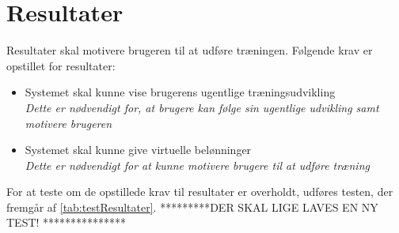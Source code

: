 \section{Resultater}
Resultater skal motivere brugeren til at udføre træningen. Følgende krav er opstillet for resultater:
\begin{itemize}
\item Systemet skal kunne vise brugerens ugentlige træningsudvikling
\\
\textit{Dette er nødvendigt for, at brugere kan følge sin ugentlige udvikling samt motivere brugeren}
\item Systemet skal kunne give virtuelle belønninger
\\
\textit{Dette er nødvendigt for at kunne motivere brugere til at udføre træning}
\end{itemize}

\noindent
For at teste om de opstillede krav til resultater er overholdt, udføres testen, der fremgår af \autoref{tab:testResultater}.
*********DER SKAL LIGE LAVES EN NY TEST! ***************

